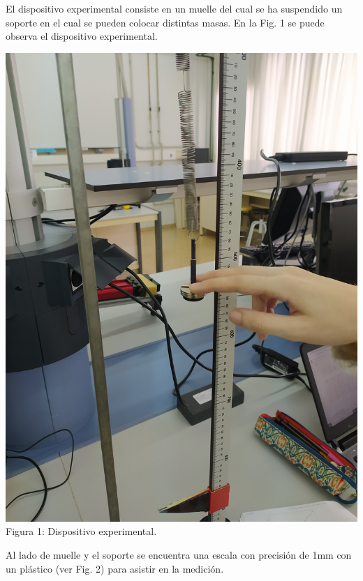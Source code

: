 \documentclass{article}
\begin{document}
\begin{multicols}{2}
El dispositivo experimental consiste en un muelle del cual se ha suspendido un soporte en el cual se pueden colocar distintas masas. En la Fig. 1 se puede observa el dispositivo experimental.
\begin{center}
  \includegraphics[scale=0.06, angle=-90, trim={500 0 1600 0}, clip]{figures/muelle_montado.jpg}\\
  Figura 1: Dispositivo experimental.
\end{center}
Al lado de muelle y el soporte se encuentra una escala con precisión de 1mm con un plástico (ver Fig. 2) para asistir en la medición.
\begin{center}

\end{center}
\end{multicols}
\end{document}
